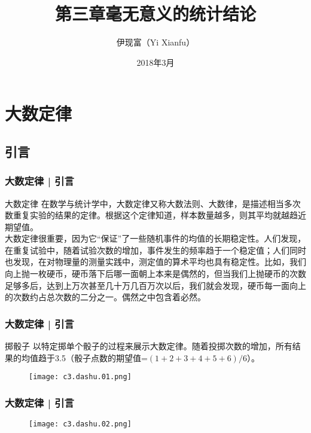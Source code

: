 



\title[无意义的统计]{第三章\quad 毫无意义的统计结论}
\author[Yixf]{伊现富（Yi Xianfu）}
\date{2018年3月}



\section{大数定律}
\subsection{引言}
\begin{frame}
  \frametitle{大数定律 | 引言}
  \begin{block}{大数定律}
    在数学与统计学中，大数定律又称大数法则、大数律，是描述相当多次数重复实验的结果的定律。根据这个定律知道，\alert{样本数量越多，则其平均就越趋近期望值}。\\
    \vspace{1em}
大数定律很重要，因为它“保证”了一些随机事件的均值的长期稳定性。人们发现，在重复试验中，随着试验次数的增加，事件发生的频率趋于一个稳定值；人们同时也发现，在对物理量的测量实践中，测定值的算术平均也具有稳定性。比如，我们向上抛一枚硬币，硬币落下后哪一面朝上本来是偶然的，但当我们上抛硬币的次数足够多后，达到上万次甚至几十万几百万次以后，我们就会发现，硬币每一面向上的次数约占总次数的二分之一。\alert{偶然之中包含着必然}。
  \end{block}
\end{frame}

\begin{frame}
  \frametitle{大数定律 | 引言}
  \begin{block}{掷骰子}
    以特定掷单个骰子的过程来展示大数定律。随着投掷次数的增加，所有结果的均值趋于3.5（骰子点数的期望值=$(1+2+3+4+5+6)/6$）。
    \vspace{-1.2em}
    \begin{figure}
      \centering
      \texttt{[image: c3.dashu.01.png]}
    \end{figure}
  \end{block}
\end{frame}

\begin{frame}
  \frametitle{大数定律 | 引言}
  \begin{figure}
    \centering
    \texttt{[image: c3.dashu.02.png]}
  \end{figure}
\end{frame}

